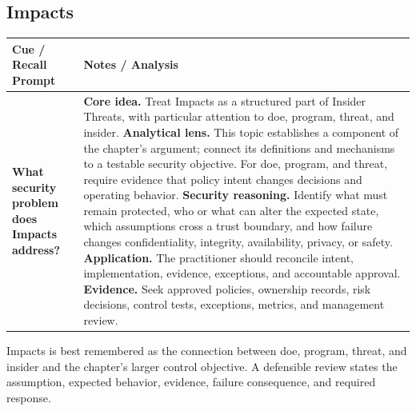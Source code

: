 \documentclass[11pt]{article}
\newcommand{\CornellHeader}{%
\rowcolor{Navy}\color{white}\bfseries Cue / Recall Prompt & \color{white}\bfseries Notes / Analysis\\\hline}
\newcommand{\CornellRow}[2]{%
\cellcolor{CueGray}\RaggedRight\textbf{#1} & \RaggedRight #2\\\hline}
\begin{document}
\subsection*{Impacts}
\begin{longtable}{>{\RaggedRight\arraybackslash}p{}|>{\RaggedRight\arraybackslash}p{}}
\CornellHeader
\CornellRow{What security problem does Impacts address?}{\textbf{Core idea.} Treat Impacts as a structured part of Insider Threats, with particular attention to doe, program, threat, and insider. \textbf{Analytical lens.} This topic establishes a component of the chapter's argument; connect its definitions and mechanisms to a testable security objective. For doe, program, and threat, require evidence that policy intent changes decisions and operating behavior. \textbf{Security reasoning.} Identify what must remain protected, who or what can alter the expected state, which assumptions cross a trust boundary, and how failure changes confidentiality, integrity, availability, privacy, or safety. \textbf{Application.} The practitioner should reconcile intent, implementation, evidence, exceptions, and accountable approval. \textbf{Evidence.} Seek approved policies, ownership records, risk decisions, control tests, exceptions, metrics, and management review.}
\end{longtable}
\begin{topicsummary}
Impacts is best remembered as the connection between doe, program, threat, and insider and the chapter's larger control objective. A defensible review states the assumption, expected behavior, evidence, failure consequence, and required response.
\end{topicsummary}
\end{document}
